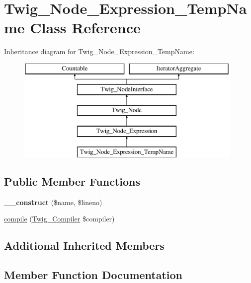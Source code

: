 \hypertarget{classTwig__Node__Expression__TempName}{}\section{Twig\+\_\+\+Node\+\_\+\+Expression\+\_\+\+Temp\+Name Class Reference}
\label{classTwig__Node__Expression__TempName}
Inheritance diagram for Twig\+\_\+\+Node\+\_\+\+Expression\+\_\+\+Temp\+Name\+:\begin{figure}[H]
\begin{center}
\leavevmode
\includegraphics[height=5.000000cm]{classTwig__Node__Expression__TempName}
\end{center}
\end{figure}
\subsection*{Public Member Functions}
\begin{DoxyCompactItemize}
\item 
{\bfseries \+\_\+\+\_\+construct} (\$name, \$lineno)\hypertarget{classTwig__Node__Expression__TempName_aa626a679883b331dd4c8de2f4e9b8907}{}\label{classTwig__Node__Expression__TempName_aa626a679883b331dd4c8de2f4e9b8907}

\item 
\hyperlink{classTwig__Node__Expression__TempName_a6394f83c8067382d16ba2b484cda3025}{compile} (\hyperlink{classTwig__Compiler}{Twig\+\_\+\+Compiler} \$compiler)
\end{DoxyCompactItemize}
\subsection*{Additional Inherited Members}


\subsection{Member Function Documentation}
